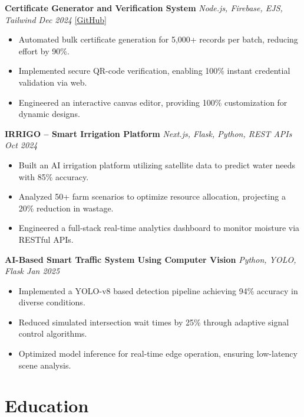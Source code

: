 \documentclass[10pt, a4paper]{article}
\begin{document}
\vspace{3pt}

\textbf{Certificate Generator and Verification System} \hfill \textit{Node.js, Firebase, EJS, Tailwind \quad Dec 2024} \quad \href{https://github.com/bbinxx/advanced-certificate-generator}{[GitHub]}
\begin{itemize}
\item Automated bulk certificate generation for 5,000+ records per batch, reducing effort by 90\%.
\item Implemented secure QR-code verification, enabling 100\% instant credential validation via web.
\item Engineered an interactive canvas editor, providing 100\% customization for dynamic designs.
\end{itemize}

\vspace{3pt}

\textbf{IRRIGO -- Smart Irrigation Platform} \hfill \textit{Next.js, Flask, Python, REST APIs \quad Oct 2024}
\begin{itemize}
\item Built an AI irrigation platform utilizing satellite data to predict water needs with 85\% accuracy.
\item Analyzed 50+ farm scenarios to optimize resource allocation, projecting a 20\% reduction in wastage.
\item Engineered a full-stack real-time analytics dashboard to monitor moisture via RESTful APIs.
\end{itemize}

\vspace{3pt}

\textbf{AI-Based Smart Traffic System Using Computer Vision} \hfill \textit{Python, YOLO, Flask \quad Jan 2025}
\begin{itemize}
\item Implemented a YOLO-v8 based detection pipeline achieving 94\% accuracy in diverse conditions.
\item Reduced simulated intersection wait times by 25\% through adaptive signal control algorithms.
\item Optimized model inference for real-time edge operation, ensuring low-latency scene analysis.
\end{itemize}

\section*{Education}
\end{document}
